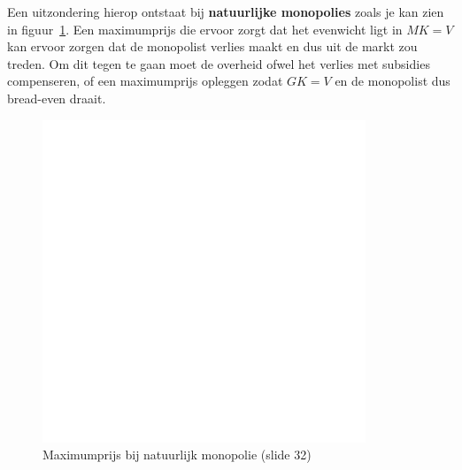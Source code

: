 Een uitzondering hierop ontstaat bij \textbf{natuurlijke monopolies} zoals je kan zien in figuur~\ref{fig:maximumprijsNatuurlijkMonopolie}. Een maximumprijs die ervoor zorgt dat het evenwicht ligt in $MK = V$ kan ervoor zorgen dat de monopolist verlies maakt en dus uit de markt zou treden. Om dit tegen te gaan moet de overheid ofwel het verlies met subsidies compenseren, of een maximumprijs opleggen zodat $GK = V$ en de monopolist dus bread-even draait.
\begin{figure}[htbp]
   \centering
   \includegraphics[scale=0.4]{Images/white.png}
   \caption{Maximumprijs bij natuurlijk monopolie (slide 32)}
   \label{fig:maximumprijsNatuurlijkMonopolie}
\end{figure}
